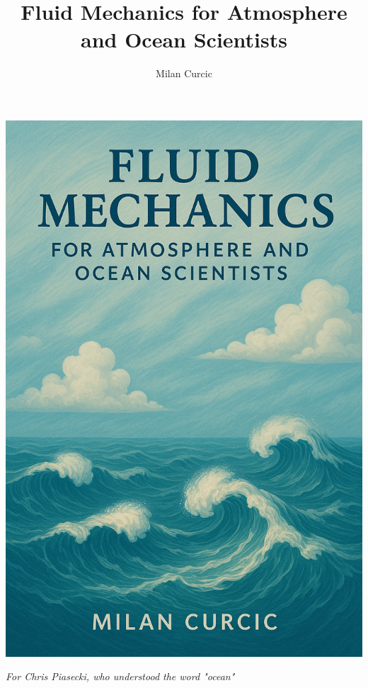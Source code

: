 \documentclass[12pt]{article}
\numberwithin{equation}{section}
\numberwithin{figure}{section}
\numberwithin{table}{section}
\begin{document}
\begin{titlepage}
\thispagestyle{empty}
\includegraphics[width=\textwidth,height=\textheight]{assets/cover.png}
\end{titlepage}

\title{Fluid Mechanics for Atmosphere and Ocean Scientists}
\author{Milan Curcic}
\maketitle

\tableofcontents

\newpage
\begin{center}
\vspace*{\fill}
\large
\textit{For Chris Piasecki, who understood the word "ocean"}
\vspace*{\fill}
\end{center}
\end{document}
